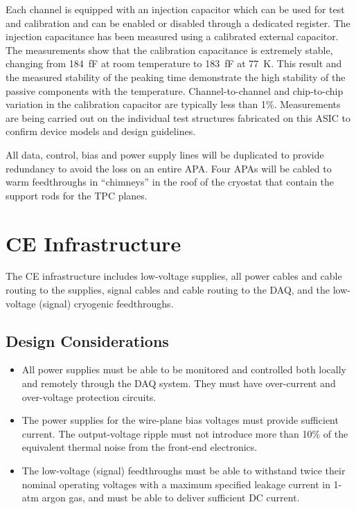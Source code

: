 Each channel is equipped with an injection capacitor which can be used
for test and calibration and can be enabled or disabled through a
dedicated register. The injection capacitance has been measured using 
a calibrated external capacitor. The measurements show
that the calibration capacitance is extremely stable, changing from
184~fF at room temperature to 183~fF at 77~K. This result and the measured
stability of the peaking time demonstrate the high stability of the
passive components with the temperature. Channel-to-channel and chip-to-chip
variation in the calibration capacitor are typically less than 1\%. Measurements are being carried
out on the individual test structures fabricated on this ASIC to
confirm device models and design guidelines.

All data, control, bias and power supply lines will be duplicated to
provide redundancy to avoid the loss on an entire APA.  Four APAs will be
cabled to warm feedthroughs in ``chimneys'' in the roof of the cryostat that
contain the support rods for the TPC planes.

\section{CE Infrastructure}
\label{sec:ce-feedthru}
   
The CE infrastructure includes low-voltage supplies, all power cables and cable routing to the supplies,
signal cables and cable routing to the DAQ, and the low-voltage (signal) cryogenic feedthroughs.

\subsection{Design Considerations} 
\label{subsec:ce-feedthru-reqs-n-specs}

\begin{itemize}
\item All power supplies must be able to be monitored and 
controlled both locally and remotely through the DAQ system.  
They must have over-current and over-voltage protection circuits.
\item The power supplies for the wire-plane bias voltages
must provide sufficient current.   The output-voltage ripple 
must not introduce more than 10\% of the equivalent thermal noise from the front-end electronics. 
\item The low-voltage (signal) feedthroughs must be able to withstand twice their nominal operating voltages 
with a maximum specified leakage current in 1-atm argon gas, and must be able to deliver sufficient DC current.
\end{itemize}

